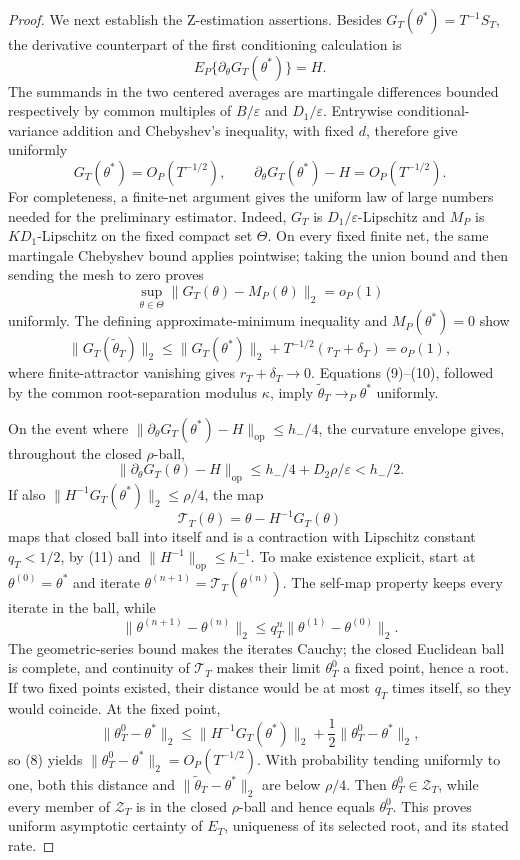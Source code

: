 \documentclass{article}
\begin{document}
\begin{proof}
We next establish the Z-estimation assertions.  Besides \(G_T(\theta^*)=T^{-1}S_T\), the derivative counterpart of the first conditioning calculation is
\[
 E_P\{\partial_\theta G_T(\theta^*)\}=H.
\]
The summands in the two centered averages are martingale differences bounded respectively by common multiples of \(B/\varepsilon\) and \(D_1/\varepsilon\).  Entrywise conditional-variance addition and Chebyshev's inequality, with fixed \(d\), therefore give uniformly
\[
 G_T(\theta^*)=O_P(T^{-1/2}),
 \qquad
 \partial_\theta G_T(\theta^*)-H=O_P(T^{-1/2}).                            \tag{8}
\]
For completeness, a finite-net argument gives the uniform law of large numbers needed for the preliminary estimator.  Indeed, \(G_T\) is \(D_1/\varepsilon\)-Lipschitz and \(M_P\) is \(KD_1\)-Lipschitz on the fixed compact set \(\Theta\).  On every fixed finite net, the same martingale Chebyshev bound applies pointwise; taking the union bound and then sending the mesh to zero proves
\[
 \sup_{\theta\in\Theta}\|G_T(\theta)-M_P(\theta)\|_2=o_P(1)               \tag{9}
\]
uniformly.  The defining approximate-minimum inequality and \(M_P(\theta^*)=0\) show
\[
 \|G_T(\widetilde\theta_T)\|_2
 \le \|G_T(\theta^*)\|_2+T^{-1/2}(r_T+\delta_T)=o_P(1),                  \tag{10}
\]
where finite-attractor vanishing gives \(r_T+\delta_T\to0\).  Equations (9)--(10), followed by the common root-separation modulus \(\kappa\), imply \(\widetilde\theta_T\to_P\theta^*\) uniformly.

On the event where \(\|\partial_\theta G_T(\theta^*)-H\|_{\mathrm{op}}\le h_-/4\), the curvature envelope gives, throughout the closed \(\rho\)-ball,
\[
 \|\partial_\theta G_T(\theta)-H\|_{\mathrm{op}}
 \le h_-/4+D_2\rho/\varepsilon<h_-/2.                                    \tag{11}
\]
If also \(\|H^{-1}G_T(\theta^*)\|_2\le\rho/4\), the map
\[
 \mathcal T_T(\theta)=\theta-H^{-1}G_T(\theta)
\]
maps that closed ball into itself and is a contraction with Lipschitz constant \(q_T<1/2\), by (11) and \(\|H^{-1}\|_{\mathrm{op}}\le h_-^{-1}\).  To make existence explicit, start at \(\theta^{(0)}=\theta^*\) and iterate \(\theta^{(n+1)}=\mathcal T_T(\theta^{(n)})\).  The self-map property keeps every iterate in the ball, while
\[
 \|\theta^{(n+1)}-\theta^{(n)}\|_2\le q_T^n\|\theta^{(1)}-\theta^{(0)}\|_2.
\]
The geometric-series bound makes the iterates Cauchy; the closed Euclidean ball is complete, and continuity of \(\mathcal T_T\) makes their limit \(\theta_T^0\) a fixed point, hence a root.  If two fixed points existed, their distance would be at most \(q_T\) times itself, so they would coincide.  At the fixed point,
\[
 \|\theta_T^0-\theta^*\|_2
 \le \|H^{-1}G_T(\theta^*)\|_2+ \frac12\|\theta_T^0-\theta^*\|_2,
\]
so (8) yields \(\|\theta_T^0-\theta^*\|_2=O_P(T^{-1/2})\).  With probability tending uniformly to one, both this distance and \(\|\widetilde\theta_T-\theta^*\|_2\) are below \(\rho/4\).  Then \(\theta_T^0\in\mathcal Z_T\), while every member of \(\mathcal Z_T\) is in the closed \(\rho\)-ball and hence equals \(\theta_T^0\).  This proves uniform asymptotic certainty of \(E_T\), uniqueness of its selected root, and its stated rate.


\end{proof}
\end{document}
